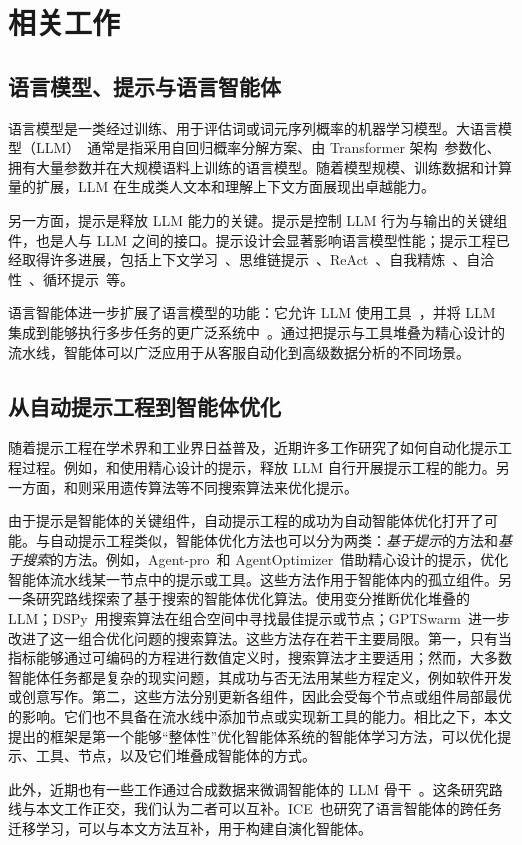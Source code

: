 \section{相关工作}

\subsection{语言模型、提示与语言智能体}

语言模型是一类经过训练、用于评估词或词元序列概率的机器学习模型。大语言模型（LLM）~\citep{gpt,gpt2,gpt3,gpt3.5,gpt4,llama,llama2}通常是指采用自回归概率分解方案、由 Transformer 架构~\citep{vaswani2017attention}参数化、拥有大量参数并在大规模语料上训练的语言模型。随着模型规模、训练数据和计算量的扩展，LLM 在生成类人文本和理解上下文方面展现出卓越能力。

另一方面，提示是释放 LLM 能力的关键。提示是控制 LLM 行为与输出的关键组件，也是人与 LLM 之间的接口。提示设计会显著影响语言模型性能；提示工程已经取得许多进展，包括上下文学习~\citep{gpt3}、思维链提示~\citep{nye2022show, wei2022chain}、ReAct~\citep{yao2022react}、自我精炼~\citep{madaan2023selfrefine}、自洽性~\citep{wang2023selfconsistency}、循环提示~\citep{zhou2023recurrentgpt}等。

语言智能体进一步扩展了语言模型的功能：它允许 LLM 使用工具~\citep{schick2023toolformer}，并将 LLM 集成到能够执行多步任务的更广泛系统中~\citep{park2023generative,hong2023metagpt,zhou2023agents,chen2023agentverse,OpenAgents}。通过把提示与工具堆叠为精心设计的流水线，智能体可以广泛应用于从客服自动化到高级数据分析的不同场景。

\subsection{从自动提示工程到智能体优化}

随着提示工程在学术界和工业界日益普及，近期许多工作研究了如何自动化提示工程过程。例如，\citet{pryzant2020automatically}和\citet{yang2024large}使用精心设计的提示，释放 LLM 自行开展提示工程的能力。另一方面，\citet{prasad-etal-2023-grips}和\citet{guo2024connecting}则采用遗传算法等不同搜索算法来优化提示。

由于提示是智能体的关键组件，自动提示工程的成功为自动智能体优化打开了可能。与自动提示工程类似，智能体优化方法也可以分为两类：\textit{基于提示}的方法和\textit{基于搜索}的方法。例如，Agent-pro~\citep{zhang2024agentpro}和 AgentOptimizer~\citep{zhang2024offline}借助精心设计的提示，优化智能体流水线某一节点中的提示或工具。这些方法作用于智能体内的孤立组件。另一条研究路线探索了基于搜索的智能体优化算法。\citet{sordoni2023joint}使用变分推断优化堆叠的 LLM；DSPy~\citep{khattab2023dspy}用搜索算法在组合空间中寻找最佳提示或节点；GPTSwarm~\citep{zhuge2024language}进一步改进了这一组合优化问题的搜索算法。这些方法存在若干主要局限。第一，只有当指标能够通过可编码的方程进行数值定义时，搜索算法才主要适用；然而，大多数智能体任务都是复杂的现实问题，其成功与否无法用某些方程定义，例如软件开发或创意写作。第二，这些方法分别更新各组件，因此会受每个节点或组件局部最优的影响。它们也不具备在流水线中添加节点或实现新工具的能力。相比之下，本文提出的\baby{}框架是第一个能够“整体性”优化智能体系统的智能体学习方法，可以优化提示、工具、节点，以及它们堆叠成智能体的方式。

此外，近期也有一些工作通过合成数据来微调智能体的 LLM 骨干~\citep{chen2023fireact,DBLP:journals/corr/abs-2401-05268,song2024trial}。这条研究路线与本文工作正交，我们认为二者可以互补。ICE~\citep{qian2024investigateconsolidateexploit}也研究了语言智能体的跨任务迁移学习，可以与本文方法互补，用于构建自演化智能体。
